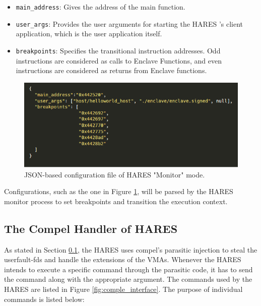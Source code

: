 \documentclass[article, doublespace,nopageskip]{VTthesis} %
\newcommand{\monitor}{HARES }
\begin{document}
    \begin{itemize}
        \item \texttt{main\_address}: Gives the address of the main function.
        \item \texttt{user\_args}: Provides the user arguments for starting the \monitor's client application, which is the user application itself.
        \item \texttt{breakpoints}: Specifies the transitional instruction addresses. Odd instructions are considered as calls to Enclave Functions, and even instructions are considered as returns from Enclave functions.
    \end{itemize}
    
    \begin{figure}[htb]
        \centering
        \includegraphics[scale=2.0]{figures/configuration_json.png}
        \caption{JSON-based configuration file of \monitor "Monitor" mode.} 
        \label{fig:config_monitor}
    \end{figure}
    
    Configurations, such as the one in Figure \ref{fig:config_monitor}, will be parsed by the \monitor monitor process to set breakpoints and transition the execution context.

    \subsection{The Compel Handler of \monitor} \label{ase:compel handler}
    As stated in Section \ref{ase:compel handler}, the \monitor uses compel's parasitic injection to steal the userfault-fds and handle the extensions of the VMAs. Whenever the \monitor intends to execute a specific command through the parasitic code, it has to send the command along with the appropriate argument. The commands used by the \monitor are listed in Figure \ref{fig:comple_interface}. The purpose of individual commands is listed below:
\end{document}
